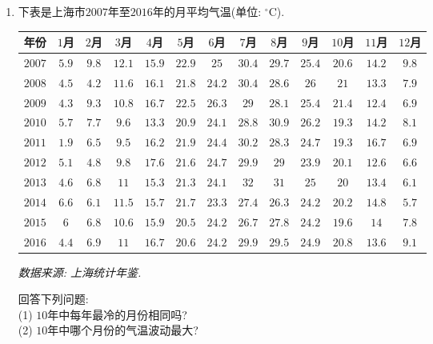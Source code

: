 \documentclass[10pt,a4paper]{article}
\begin{document}
\begin{enumerate}[1.]

\item 下表是上海市$2007$年至$2016$年的月平均气温(单位: $^\circ\text{C}$).
\begin{center}
    \begin{tabular}{|c|c|c|c|c|c|c|c|c|c|c|c|c|}
        \hline
        年份 & $1$月 & $2$月 & $3$月 & $4$月 & $5$月 & $6$月 & $7$月 & $8$月 & $9$月 & $10$月 & $11$月 & $12$月 \\ \hline
        $2007$ & $5.9$ & $9.8$ & $12.1$ & $15.9$ & $22.9$ & $25$ & $30.4$ & $29.7$ & $25.4$ & $20.6$ & $14.2$ & $9.8$ \\ \hline
        $2008$ & $4.5$ & $4.2$ & $11.6$ & $16.1$ & $21.8$ & $24.2$ & $30.4$ & $28.6$ & $26$ & $21$ & $13.3$ & $7.9$ \\ \hline
        $2009$ & $4.3$ & $9.3$ & $10.8$ & $16.7$ & $22.5$ & $26.3$ & $29$ & $28.1$ & $25.4$ & $21.4$ & $12.4$ & $6.9$ \\ \hline
        $2010$ & $5.7$ & $7.7$ & $9.6$ & $13.3$ & $20.9$ & $24.1$ & $28.8$ & $30.9$ & $26.2$ & $19.3$ & $14.2$ & $8.1$\\ \hline
        $2011$ & $1.9$ & $6.5$ & $9.5$ & $16.2$ & $21.9$ & $24.4$ & $30.2$ & $28.3$ & $24.7$ & $19.3$ & $16.7$ & $6.9$\\ \hline
        $2012$ & $5.1$ & $4.8$ & $9.8$ & $17.6$ & $21.6$ & $24.7$ & $29.9$ & $29$ & $23.9$ & $20.1$ & $12.6$ & $6.6$\\ \hline
        $2013$ & $4.6$ & $6.8$ & $11$ & $15.3$ & $21.3$ & $24.1$ & $32$ &  $31$ & $25$ & $20$ & $13.4$ & $6.1$\\ \hline
        $2014$ & $6.6$ & $6.1$ & $11.5$ & $15.7$ & $21.7$ & $23.3$ & $27.4$ & $26.3$ & $24.2$ & $20.2$ & $14.8$ & $5.7$\\ \hline
        $2015$ & $6$ & $6.8$ & $10.6$ & $15.9$ & $20.5$ & $24.2$ & $26.7$ & $27.8$ & $24.2$ & $19.6$ & $14$ & $7.8$\\ \hline
        $2016$ & $4.4$ & $6.9$ & $11$ & $16.7$ & $20.6$ & $24.2$ & $29.9$ & $29.5$ & $24.9$ & $20.8$ & $13.6$ & $9.1$\\ \hline
    \end{tabular}
\end{center}
\begin{flushright}
{\it 数据来源: 上海统计年鉴.}
\end{flushright}
回答下列问题:\\
(1) $10$年中每年最冷的月份相同吗?\\
(2) $10$年中哪个月份的气温波动最大?\\

\end{enumerate}
\end{document}
